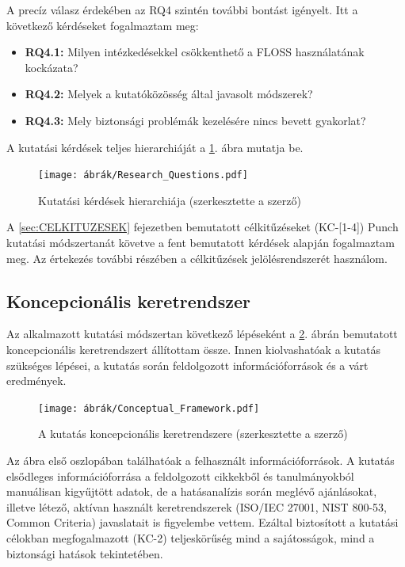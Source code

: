 \documentclass[12pt,magyar,a4paper,oneside]{scrreprt}
\providecommand{\tightlist}{%
  \setlength{\itemsep}{0pt}\setlength{\parskip}{0pt}}
\begin{document}
A precíz válasz érdekében az RQ4 szintén további bontást igényelt. Itt a
következő kérdéseket fogalmaztam meg:

\begin{itemize}
\tightlist
\item
  \textbf{RQ4.1:} Milyen intézkedésekkel csökkenthető a FLOSS
  használatának kockázata?
\item
  \textbf{RQ4.2:} Melyek a kutatóközösség által javasolt módszerek?
\item
  \textbf{RQ4.3:} Mely biztonsági problémák kezelésére nincs bevett
  gyakorlat?
\end{itemize}

A kutatási kérdések teljes hierarchiáját a \ref{fig:RQ}. ábra mutatja
be.

\begin{figure}
\hypertarget{fig:RQ}{%
\centering
\texttt{[image: ábrák/Research\_Questions.pdf]}
\caption{Kutatási kérdések hierarchiája (szerkesztette a
szerző)}\label{fig:RQ}
}
\end{figure}

A \ref{sec:CELKITUZESEK} fejezetben bemutatott célkitűzéseket
(KC-{[}1-4{]}) Punch kutatási módszertanát követve a fent bemutatott
kérdések alapján fogalmaztam meg. Az értekezés további részében a
célkitűzések jelölésrendszerét használom.

\hypertarget{koncepcionuxe1lis-keretrendszer}{%
\subsection{Koncepcionális
keretrendszer}\label{koncepcionuxe1lis-keretrendszer}}

Az alkalmazott kutatási módszertan következő lépéseként a
\ref{fig:ConFW}. ábrán bemutatott koncepcionális keretrendszert
állítottam össze. Innen kiolvashatóak a kutatás szükséges lépései, a
kutatás során feldolgozott információforrások és a várt eredmények.

\begin{figure}
\hypertarget{fig:ConFW}{%
\centering
\texttt{[image: ábrák/Conceptual\_Framework.pdf]}
\caption{A kutatás koncepcionális keretrendszere (szerkesztette a
szerző)}\label{fig:ConFW}
}
\end{figure}

Az ábra első oszlopában találhatóak a felhasznált információforrások. A
kutatás elsődleges információforrása a feldolgozott cikkekből és
tanulmányokból manuálisan kigyűjtött adatok, de a hatásanalízis során
meglévő ajánlásokat, illetve létező, aktívan használt keretrendszerek
(ISO/IEC 27001, NIST 800-53, Common Criteria) javaslatait is figyelembe
vettem. Ezáltal biztosított a kutatási célokban megfogalmazott (KC-2)
teljeskörűség mind a sajátosságok, mind a biztonsági hatások
tekintetében.
\end{document}
